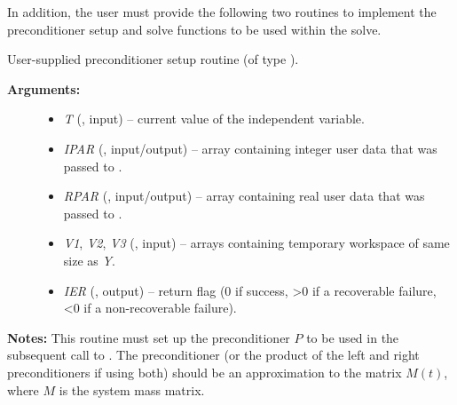 \documentclass[letterpaper,10pt,english]{sphinxmanual}
\begin{document}
In addition, the user must provide the following two routines to
implement the preconditioner setup and solve functions to be used
within the solve.

\begin{fulllineitems}
\label{f_interface/Usage:f/_/FARKMASSPSET}
User-supplied preconditioner setup routine (of type
{\hyperref[c_interface/User_supplied:c.ARKSpilsMassPrecSetupFn]{\emph{}}}).
\begin{description}
\item[{\textbf{Arguments:}}] \leavevmode\begin{itemize}
\item {} 
\emph{T} (, input) -- current value of the independent
variable.

\item {} 
\emph{IPAR} (, input/output) -- array containing
integer user data that was passed to {\hyperref[f_interface/Usage:f/_/FARKMALLOC]{\emph{}}}.

\item {} 
\emph{RPAR} (, input/output) -- array containing real
user data that was passed to {\hyperref[f_interface/Usage:f/_/FARKMALLOC]{\emph{}}}.

\item {} 
\emph{V1}, \emph{V2}, \emph{V3} (, input) -- arrays containing
temporary workspace of same size as \emph{Y}.

\item {} 
\emph{IER}  (, output) -- return flag  (0 if success, \textgreater{}0 if
a recoverable failure, \textless{}0 if a non-recoverable failure).

\end{itemize}

\end{description}

\textbf{Notes:}
This routine must set up the preconditioner \(P\) to be used in
the subsequent call to {\hyperref[f_interface/Usage:f/_/FARKMASSPSOL]{\emph{}}}.  The
preconditioner (or the product of the left and right
preconditioners if using both) should be an approximation to the
matrix \(M(t)\), where \(M\) is the system mass matrix.

\end{fulllineitems}
\end{document}
